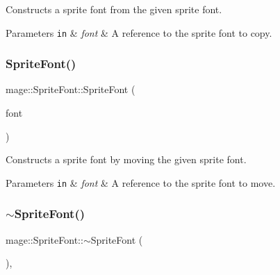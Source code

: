 Constructs a sprite font from the given sprite font.


\begin{DoxyParams}[1]{Parameters}
\mbox{\tt in}  & {\em font} & A reference to the sprite font to copy. \\
\hline
\end{DoxyParams}
\hypertarget{classmage_1_1_sprite_font_ad1ba3d6947515b36b40b037a2760df29}{}\label{classmage_1_1_sprite_font_ad1ba3d6947515b36b40b037a2760df29} 
\subsubsection{\texorpdfstring{Sprite\+Font()}{SpriteFont()}\hspace{0.1cm}{\footnotesize\ttfamily [3/3]}}
{\footnotesize\ttfamily mage\+::\+Sprite\+Font\+::\+Sprite\+Font (\begin{DoxyParamCaption}\item[{\hyperlink{classmage_1_1_sprite_font}{Sprite\+Font} \&\&}]{font }\end{DoxyParamCaption})\hspace{0.3cm}{\ttfamily [default]}}

Constructs a sprite font by moving the given sprite font.


\begin{DoxyParams}[1]{Parameters}
\mbox{\tt in}  & {\em font} & A reference to the sprite font to move. \\
\hline
\end{DoxyParams}
\hypertarget{classmage_1_1_sprite_font_acbf50687b4a5dbb2ff1ad73ecc89b7f1}{}\label{classmage_1_1_sprite_font_acbf50687b4a5dbb2ff1ad73ecc89b7f1} 
\subsubsection{\texorpdfstring{$\sim$\+Sprite\+Font()}{~SpriteFont()}}
{\footnotesize\ttfamily mage\+::\+Sprite\+Font\+::$\sim$\+Sprite\+Font (\begin{DoxyParamCaption}{ }\end{DoxyParamCaption})\hspace{0.3cm}{\ttfamily [virtual]}, {\ttfamily [default]}}


